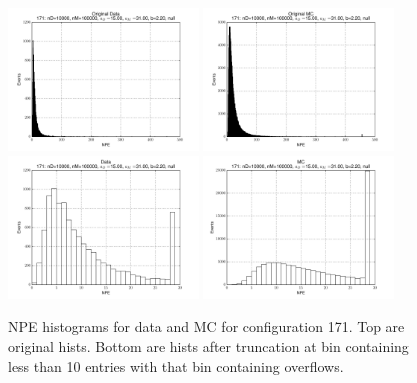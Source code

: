  \begin{figure}[htbp] \begin{center} 
\includegraphics[width=0.45\textwidth]{../FIGURES/171/FIG_Original_Data.pdf} 
\includegraphics[width=0.45\textwidth]{../FIGURES/171/FIG_Original_MC.pdf} 
\includegraphics[width=0.45\textwidth]{../FIGURES/171/FIG_Data.pdf} 
\includegraphics[width=0.45\textwidth]{../FIGURES/171/FIG_MC.pdf} 
\caption{NPE histograms for data and MC for configuration 171. Top are original hists. Bottom are hists after truncation at bin containing less than 10 entries with that bin containing overflows.} 
\label{tab:npe_171} 
\end{center} \end{figure} 


